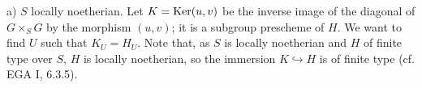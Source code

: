 a) $S$ locally noetherian. Let $K=\operatorname{Ker}(u,v)$ be the inverse image of the diagonal of $G\times_S G$ by the morphism $(u,v)$; it is a subgroup prescheme of $H$. We want to find $U$ such that $K_U=H_U$. Note that, as $S$ is locally noetherian and $H$ of finite type over $S$, $H$ is locally noetherian, so the immersion $K\hookrightarrow H$ is of finite type (cf. EGA I, 6.3.5).
